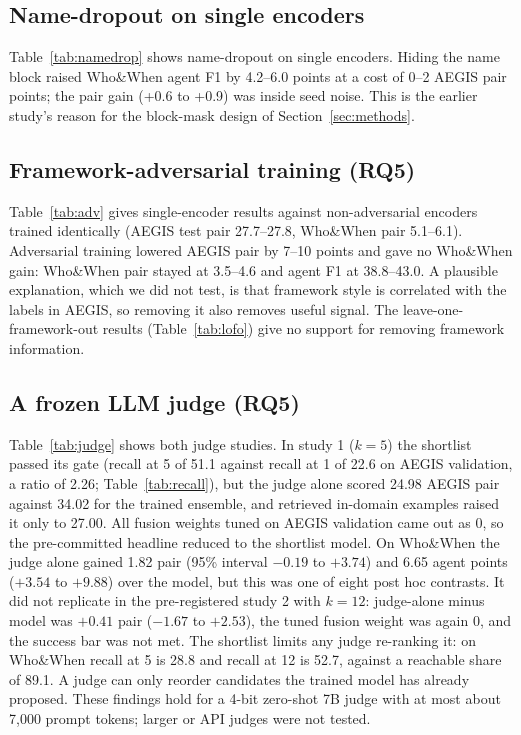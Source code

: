 \documentclass[conference]{IEEEtran}
\begin{document}
\subsection{Name-dropout on single encoders}
Table~\ref{tab:namedrop} shows name-dropout on single encoders. Hiding the name block raised Who\&When agent F1 by 4.2--6.0 points at a cost of 0--2 AEGIS pair points; the pair gain (+0.6 to +0.9) was inside seed noise. This is the earlier study's reason for the block-mask design of Section~\ref{sec:methods}.

\subsection{Framework-adversarial training (RQ5)}
Table~\ref{tab:adv} gives single-encoder results against non-adversarial encoders trained identically (AEGIS test pair 27.7--27.8, Who\&When pair 5.1--6.1). Adversarial training lowered AEGIS pair by 7--10 points and gave no Who\&When gain: Who\&When pair stayed at 3.5--4.6 and agent F1 at 38.8--43.0. A plausible explanation, which we did not test, is that framework style is correlated with the labels in AEGIS, so removing it also removes useful signal. The leave-one-framework-out results (Table~\ref{tab:lofo}) give no support for removing framework information.

\subsection{A frozen LLM judge (RQ5)}
Table~\ref{tab:judge} shows both judge studies. In study 1 ($k=5$) the shortlist passed its gate (recall at 5 of 51.1 against recall at 1 of 22.6 on AEGIS validation, a ratio of 2.26; Table~\ref{tab:recall}), but the judge alone scored 24.98 AEGIS pair against 34.02 for the trained ensemble, and retrieved in-domain examples raised it only to 27.00. All fusion weights tuned on AEGIS validation came out as 0, so the pre-committed headline reduced to the shortlist model. On Who\&When the judge alone gained 1.82 pair (95\% interval $-0.19$ to $+3.74$) and 6.65 agent points ($+3.54$ to $+9.88$) over the model, but this was one of eight post hoc contrasts. It did not replicate in the pre-registered study 2 with $k=12$: judge-alone minus model was $+0.41$ pair ($-1.67$ to $+2.53$), the tuned fusion weight was again 0, and the success bar was not met. The shortlist limits any judge re-ranking it: on Who\&When recall at 5 is 28.8 and recall at 12 is 52.7, against a reachable share of 89.1. A judge can only reorder candidates the trained model has already proposed. These findings hold for a 4-bit zero-shot 7B judge with at most about 7,000 prompt tokens; larger or API judges were not tested.
\end{document}
